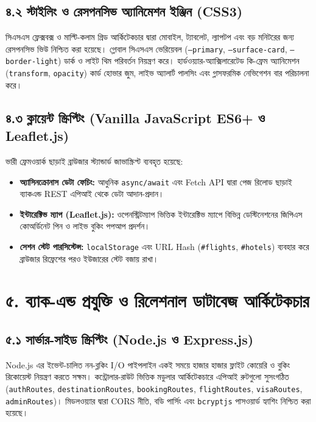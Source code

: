 \documentclass[11pt,a4paper]{article}
\begin{document}
\subsection{৪.২ স্টাইলিং ও রেসপনসিভ অ্যানিমেশন ইঞ্জিন (CSS3)}
সিএসএস ফ্লেক্সবক্স ও মাল্টি-কলাম গ্রিড আর্কিটেকচার দ্বারা মোবাইল, ট্যাবলেট, ল্যাপটপ এবং বড় মনিটরের জন্য রেসপনসিভ ভিউ নিশ্চিত করা হয়েছে। গ্লোবাল সিএসএস ভেরিয়েবল (\texttt{--primary}, \texttt{--surface-card}, \texttt{--border-light}) ডার্ক ও লাইট থিম পরিবর্তন নিয়ন্ত্রণ করে। হার্ডওয়্যার-অ্যাক্সিলারেটেড কি-ফ্রেম অ্যানিমেশন (\texttt{transform}, \texttt{opacity}) কার্ড হোভার জুম, লাইভ অ্যালার্ট পালসিং এবং গ্লাসফরমিক নেভিগেশন বার পরিচালনা করে।

\subsection{৪.৩ ক্লায়েন্ট স্ক্রিপ্টিং (Vanilla JavaScript ES6+ ও Leaflet.js)}
ভারী ফ্রেমওয়ার্ক ছাড়াই ব্রাউজার স্ট্যান্ডার্ড জাভাস্ক্রিপ্ট ব্যবহৃত হয়েছে:
\begin{itemize}[leftmargin=*]
    \item \textbf{অ্যাসিনক্রোনাস ডেটা ফেচিং:} আধুনিক \texttt{async/await} এবং Fetch API দ্বারা পেজ রিলোড ছাড়াই ব্যাকএন্ড REST এপিআই থেকে ডেটা আদান-প্রদান।
    \item \textbf{ইন্টারেক্টিভ ম্যাপ (Leaflet.js):} ওপেনস্ট্রিটম্যাপ ভিত্তিক ইন্টারেক্টিভ ম্যাপে বিভিন্ন ডেস্টিনেশনের জিপিএস কোঅর্ডিনেট পিন ও লাইভ বুকিং পপআপ প্রদর্শন।
    \item \textbf{সেশন স্টেট পারসিস্টেন্স:} \texttt{localStorage} এবং URL Hash (\texttt{\#flights}, \texttt{\#hotels}) ব্যবহার করে ব্রাউজার রিফ্রেশের পরও ইউজারের স্টেট বজায় রাখা।
\end{itemize}

\section{৫. ব্যাক-এন্ড প্রযুক্তি ও রিলেশনাল ডাটাবেজ আর্কিটেকচার}

\subsection{৫.১ সার্ভার-সাইড স্ক্রিপ্টিং (Node.js ও Express.js)}
Node.js এর ইভেন্ট-চালিত নন-ব্লকিং I/O পাইপলাইন একই সময়ে হাজার হাজার ফ্লাইট কোয়েরি ও বুকিং রিকোয়েস্ট নিয়ন্ত্রণ করতে সক্ষম। কন্ট্রোলার-রাউট ভিত্তিক মডুলার আর্কিটেকচারে এপিআই রুটগুলো সুসংগঠিত (\texttt{authRoutes}, \texttt{destinationRoutes}, \texttt{bookingRoutes}, \texttt{flightRoutes}, \texttt{visaRoutes}, \texttt{adminRoutes})। মিডলওয়্যার দ্বারা CORS নীতি, বডি পার্সিং এবং \texttt{bcryptjs} পাসওয়ার্ড হ্যাশিং নিশ্চিত করা হয়েছে।
\end{document}
